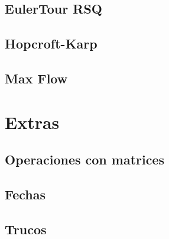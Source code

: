 \subsection{EulerTour RSQ}
\raggedbottom
\hrulefill
\subsection{Hopcroft-Karp}
\raggedbottom
\hrulefill
\subsection{Max Flow}
\raggedbottom
\hrulefill
\newpage

\section{Extras}
\subsection{Operaciones con matrices}
\raggedbottom
\hrulefill
\subsection{Fechas}
\raggedbottom
\hrulefill
\subsection{Trucos}
\raggedbottom
\hrulefill
\newpage

